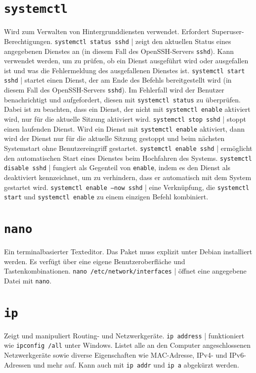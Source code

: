 \documentclass{article}
\newcommand{\doublebreak}{\break\break}
\begin{document}
	\section{\texttt{systemctl}}
	Wird zum Verwalten von Hintergrunddiensten verwendet. Erfordert Superuser-Berechtigungen.
	\doublebreak
	\texttt{systemctl status sshd} | zeigt den aktuellen Status eines angegebenen Dienstes an (in diesem Fall des OpenSSH-Servers \texttt{sshd}). Kann verwendet werden, um zu prüfen, ob ein Dienst ausgeführt wird oder ausgefallen ist und was die Fehlermeldung des ausgefallenen Dienstes ist.
	\doublebreak
	\texttt{systemctl start sshd} | startet einen Dienst, der am Ende des Befehls bereitgestellt wird (in diesem Fall des OpenSSH-Servers \texttt{sshd}). Im Fehlerfall wird der Benutzer benachrichtigt und aufgefordert, diesen mit \texttt{systemctl status} zu überprüfen. Dabei ist zu beachten, dass ein Dienst, der nicht mit \texttt{systemctl enable} aktiviert wird, nur für die aktuelle Sitzung aktiviert wird.
	\doublebreak
	\texttt{systemctl stop sshd} | stoppt einen laufenden Dienst. Wird ein Dienst mit \texttt{systemctl enable} aktiviert, dann wird der Dienst nur für die aktuelle Sitzung gestoppt und beim nächsten Systemstart ohne Benutzereingriff gestartet.
	\doublebreak
	\texttt{systemctl enable sshd} | ermöglicht den automatischen Start eines Dienstes beim Hochfahren des Systems.
	\doublebreak
	\texttt{systemctl disable sshd} | fungiert als Gegenteil von \texttt{enable}, indem es den Dienst als deaktiviert kennzeichnet, um zu verhindern, dass er automatisch mit dem System gestartet wird.
	\doublebreak
	\texttt{systemctl enable --now sshd} | eine Verknüpfung, die \texttt{systemctl start} und \texttt{systemctl enable} zu einem einzigen Befehl kombiniert.
	
	\section{\texttt{nano}}
	Ein terminalbasierter Texteditor. Das Paket muss explizit unter Debian installiert werden. Es verfügt über eine eigene Benutzeroberfläche und Tastenkombinationen.
	\doublebreak
	\texttt{nano /etc/network/interfaces} | öffnet eine angegebene Datei mit \texttt{nano}.
	
	\section{\texttt{ip}}
	Zeigt und manipuliert Routing- und Netzwerkgeräte.
	\doublebreak
	\texttt{ip address} | funktioniert wie \texttt{ipconfig /all} unter Windows. Listet alle an den Computer angeschlossenen Netzwerkgeräte sowie diverse Eigenschaften wie MAC-Adresse, IPv4- und IPv6-Adressen und mehr auf. Kann auch mit \texttt{ip addr} und \texttt{ip a} abgekürzt werden.
	
\end{document}
